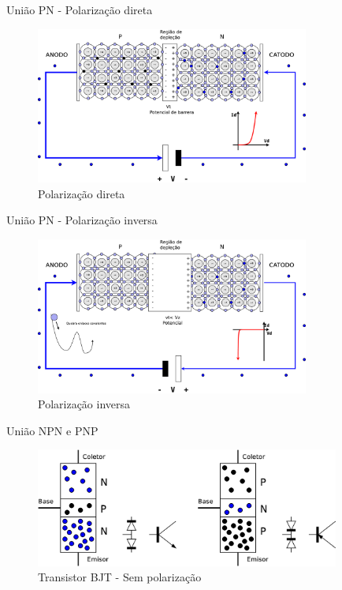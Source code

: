 \documentclass[envcountsect,dvips]{beamer}
\begin{document}
\begin{frame}{União PN - Polarização direta }
\begin{figure}
\centering
\includegraphics[width=9cm]{images/semipn.eps}
\caption{Polarização direta}
\label{fig:semipn0}
\end{figure}
\end{frame}

\begin{frame}{União PN - Polarização inversa }
\begin{figure}
\centering
\includegraphics[width=9cm]{images/semipn2.eps}
\caption{Polarização inversa}
\label{fig:semipn0}
\end{figure}
\end{frame}

\begin{frame}{União NPN e PNP}
\begin{figure}
\centering
\includegraphics[width=10cm]{images/npn-pnp.eps}
\caption{Transistor BJT - Sem polarização}
\label{fig:npnpnp}
\end{figure}
\end{frame}
\end{document}

